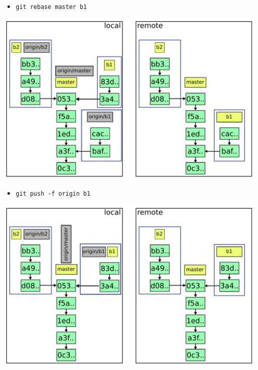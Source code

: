 \documentclass{beamer}
\begin{document}
\begin{frame}{}
  \begin{itemize}
  \item \lstinline|git rebase master b1|
  \end{itemize}
\end{frame}

\begin{frame}{}
  \includegraphics[width=\textwidth]{img/5.pdf}
\end{frame}

\begin{frame}{}
  \begin{itemize}
  \item \lstinline|git push -f origin b1|
  \end{itemize}
\end{frame}

\begin{frame}{}
  \includegraphics[width=\textwidth]{img/6.pdf}
\end{frame}
\end{document}
